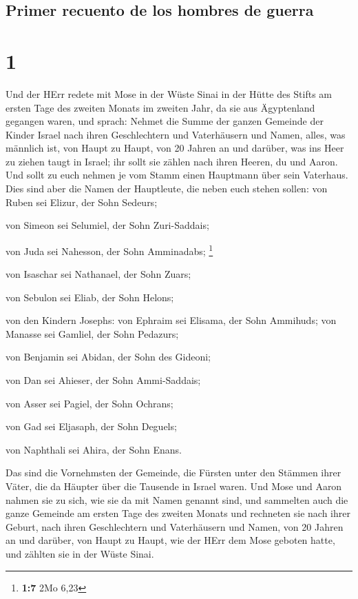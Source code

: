 \hypertarget{primer-recuento-de-los-hombres-de-guerra}{%
\subsection{Primer recuento de los hombres de
guerra}\label{primer-recuento-de-los-hombres-de-guerra}}

\hypertarget{section}{%
\section{1}\label{section}}

 Und der HErr redete mit Mose in der Wüste Sinai in der
Hütte des Stifts am ersten Tage des zweiten Monats im zweiten Jahr, da
sie aus Ägyptenland gegangen waren, und sprach:  Nehmet
die Summe der ganzen Gemeinde der Kinder Israel nach ihren Geschlechtern
und Vaterhäusern und Namen, alles, was männlich ist, von Haupt zu Haupt,
 von 20 Jahren an und darüber, was ins Heer zu ziehen
taugt in Israel; ihr sollt sie zählen nach ihren Heeren, du und Aaron.
 Und sollt zu euch nehmen je vom Stamm einen Hauptmann
über sein Vaterhaus.  Dies sind aber die Namen der
Hauptleute, die neben euch stehen sollen: von Ruben sei Elizur, der Sohn
Sedeurs;

 von Simeon sei Selumiel, der Sohn Zuri-Saddais;

 von Juda sei Nahesson, der Sohn Amminadabs; \footnote{\textbf{1:7}
  2Mo 6,23}

 von Isaschar sei Nathanael, der Sohn Zuars;

 von Sebulon sei Eliab, der Sohn Helons;

 von den Kindern Josephs: von Ephraim sei Elisama, der
Sohn Ammihuds; von Manasse sei Gamliel, der Sohn Pedazurs;

 von Benjamin sei Abidan, der Sohn des Gideoni;

 von Dan sei Ahieser, der Sohn Ammi-Saddais;

 von Asser sei Pagiel, der Sohn Ochrans;

 von Gad sei Eljasaph, der Sohn Deguels;

 von Naphthali sei Ahira, der Sohn Enans.

 Das sind die Vornehmsten der Gemeinde, die Fürsten unter
den Stämmen ihrer Väter, die da Häupter über die Tausende in Israel
waren.  Und Mose und Aaron nahmen sie zu sich, wie sie da
mit Namen genannt sind,  und sammelten auch die ganze
Gemeinde am ersten Tage des zweiten Monats und rechneten sie nach ihrer
Geburt, nach ihren Geschlechtern und Vaterhäusern und Namen, von 20
Jahren an und darüber, von Haupt zu Haupt,  wie der HErr
dem Mose geboten hatte, und zählten sie in der Wüste Sinai.

